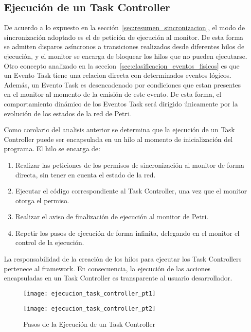 \subsection{Ejecución de un Task Controller}
\label{sec:ejecucion_task_controller}
De acuerdo a lo expuesto en la sección~\ref{sec:resumen_sincronizacion}, el 
modo de sincronización adoptado es el de petición de ejecución al monitor. 
De esta forma se admiten disparos asíncronos a transiciones realizados desde
diferentes hilos de ejecución, y el monitor se encarga de bloquear los hilos que
no pueden ejecutarse.
Otro concepto analizado en la seccion~\ref{sec:clasificacion_eventos_fisicos}
es que un Evento Task tiene una
relacion directa con determinados eventos lógicos. Además, un Evento Task es
desencadenado por condiciones que estan presentes en el monitor al momento de
la emisión de este evento. De esta forma, el comportamiento dinámico de los
Eventos Task será dirigido únicamente por la evolución de los estados de la red
de Petri.

Como corolario del analisis anterior se determina que la ejecución de un Task
Controller puede ser encapsulada en un hilo al momento de inicialización del programa.
El hilo se encarga de:
\begin{enumerate}
  \item Realizar las peticiones de los permisos de sincronización al
  monitor de forma directa, sin tener en cuenta el estado de la red.
  \item  Ejecutar el código correspondiente al Task Controller, una vez que el
  monitor otorga el permiso.
  \item  Realizar el aviso de finalización de ejecución al monitor de Petri.
  \item Repetir los pasos de ejecución de forma infinita, delegando en el
  monitor el control de la ejecución.
\end{enumerate}

La responsabilidad de la creación de los hilos para ejecutar los Task
Controllers pertenece al framework. En consecuencia, la ejecución de las
acciones encapsuladas en un Task Controller es transparente al usuario
desarrollador.

\begin{figure}[H]
	\centering
	\texttt{[image: ejecucion\_task\_controller\_pt1]}
\end{figure}
\begin{figure}[H]
	\centering
	\texttt{[image: ejecucion\_task\_controller\_pt2]}
	\caption{Pasos de la Ejecución de un Task Controller}
	\label{fig:ejecucion_task_controller}
\end{figure}

